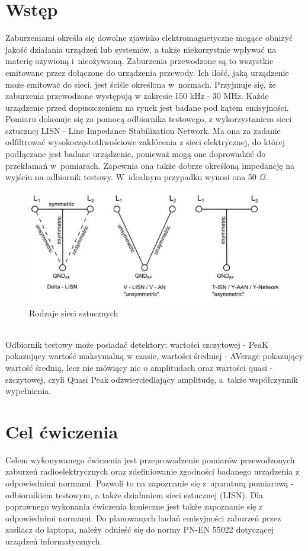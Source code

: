\documentclass[12pt, a4paper, oneside]{article}
\begin{document}
\section{Wstęp}
\indent\indent Zaburzeniami określa się dowolne zjawisko elektromagnetyczne mogące obniżyć jakość działania urządzeń lub systemów, a także niekorzystnie wpływać na materię ożywioną i~nieożywioną. Zaburzenia przewodzone są to wszystkie emitowane przez dołączone do urządzenia przewody. Ich ilość, jaką urządzenie może emitować do sieci, jest ściśle określona w~normach. Przyjmuje się, że zaburzenia przewodzone występują w zakresie 150 kHz - 30 MHz. Każde urządzenie przed dopuszczeniem na rynek jest badane pod kątem emisyjności. Pomiaru dokonuje się za pomocą odbiornika testowego, z wykorzystaniem sieci sztucznej LISN - Line Impedance Stabilization Network. Ma ona za zadanie odfiltrować wysokoczęstotliwościowe zakłócenia z sieci elektrycznej, do której podłączane jest badane urządzenie, ponieważ mogą one doprowadzić do przekłamań w~pomiarach. Zapewnia ona także dobrze określoną impedancję na wyjściu na odbiornik testowy. W~idealnym przypadku wynosi ona 50 $\Omega$.
\begin{figure}[h!]
\centering
\caption{Rodzaje sieci sztucznych}
\includegraphics[scale=0.65]{f1.png}
\end{figure}\\
\indent Odbiornik testowy może posiadać detektory: wartości szczytowej - PeaK pokazujący wartość maksymalną w czasie, wartości średniej - AVerage pokazujący wartość średnią, lecz nie mówiący nic o amplitudach oraz wartości quasi - szczytowej, czyli Quasi Peak odzwierciedlający amplitudę, a~także współczynnik wypełnienia.
\section{Cel ćwiczenia}
\indent\indent Celem wykonywanego ćwiczenia jest przeprowadzenie pomiarów przewodzonych zaburzeń radioelektrycznych oraz zdefiniowanie zgodności badanego urządzenia z odpowiednimi normami. Pozwoli to na zapoznanie się z~aparaturą pomiarową - odbiornikiem testowym, a także działaniem sieci sztucznej (LISN). Dla poprawnego wykonania ćwiczenia konieczne jest także zapoznanie się z odpowiednimi normami. Do planowanych badań emisyjności zaburzeń przez zasilacz do laptopa, należy odnieść się do normy PN-EN 55022 dotyczącej urządzeń informatycznych.
\end{document}
